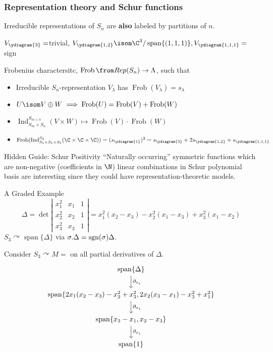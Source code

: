 \documentclass[dvipsnames]{beamer}
\renewcommand{\Span}{\operatorname{span}}
\DeclareMathOperator{\Ind}{Ind}
\newcommand{\sgn}{\text{\rm sgn}}
\theoremstyle{definition}
\newcounter{c}
\begin{document}
\begin{frame}
  \frametitle{Representation theory and Schur functions}
 Irreducible representations of \(S_n\) are \textbf{also} labeled by
      partitions of \(n\). \pause 
      \begin{center}
        \(V_{\ydiagram{3}} = \)trivial,
        \(V_{\ydiagram{1,2}} \isom \C^3 / \Span\{(1,1,1)\},
        V_{\ydiagram{1,1,1}} = \)sign
      \end{center}\pause
  Frobenius charactersitc, \(\operatorname{Frob}\from Rep(S_n) \to
  \Lambda\), such that \pause
    \begin{itemize}
    \item Irreducible \(S_n\)-representation \(V_\lambda\) has 
      \(\operatorname{Frob}(V_\lambda) = s_\lambda\) \pause
    \item \(U \isom V \oplus W \implies \operatorname{Frob}(U) = \operatorname{Frob}(V)+\operatorname{Frob}(W)\)\pause
    \item \(\Ind_{S_m \times S_n}^{S_{m+n}} (V \times W) \mapsto
      \operatorname{Frob}(V) \cdot \operatorname{Frob}(W)\) \pause
    \item \(\operatorname{Frob}( \Ind_{S_1 \times S_1 \times S_1}^{S_3} (\C \times \C
    \times \C) ) = (s_{\ydiagram{1}})^3 = s_{\ydiagram{3}} + 2 s_{\ydiagram{1,2}} + s_{\ydiagram{1,1,1}}\)\pause
    \end{itemize}
  \begin{block}{Hidden Guide: Schur Positivity}
    ``Naturally occurring'' symmetric functions which are non-negative
    (coefficients in \(\N\))
    linear combinations in Schur polynomial basis
     are interesting since they could have representation-theoretic models.
  \end{block}
\end{frame}
\begin{frame}{A Graded Example}
   \[
     \Delta = \det \left|
       \begin{matrix}
         x_1^2 & x_1 & 1\\
         x_2^2 & x_2 & 1\\
         x_3^2 & x_3 & 1
       \end{matrix}
     \right| = x_1^2(x_2-x_3) - x_2^2 (x_1 - x_3) + x_3^2(x_1-x_2)
   \]
   \(S_3 \curvearrowright \Span\{\Delta\}\) via \(\sigma.\Delta =
   \sgn(\sigma) \Delta\).\pause

   Consider \(S_3 \curvearrowright M = \) on all partial derivatives of \(\Delta\).
   \[
   \begin{tikzcd}
     \Span \{\Delta \} \ar[d, "\partial_{x_i}"]\\
     \Span\{2x_1(x_2-x_3)-x_2^2+x_3^2, 2x_2(x_3-x_1)-x_3^2+x_1^2\}
     \ar[d,"\partial_{x_i}"]\\
     \Span\{x_3-x_1, x_2-x_3\} \ar[d,"\partial_{x_i}"]\\
     \Span\{1\}
   \end{tikzcd}
   \]
\end{frame}
\end{document}
